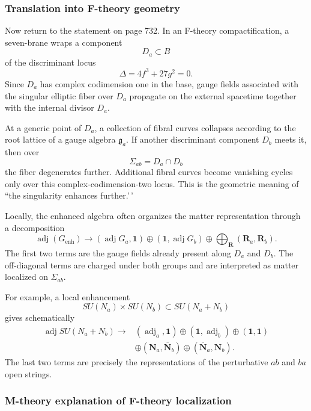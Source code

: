 \documentclass[
  10pt,
  a4paper,
  openany]{book}
\begin{document}
\subsubsection{Translation into F-theory
geometry}\label{translation-into-f-theory-geometry}

Now return to the statement on page 732. In an F-theory
compactification, a seven-brane wraps a component \[
D_a\subset B
\] of the discriminant locus \[
\Delta=4f^3+27g^2=0.
\] Since \(D_a\) has complex codimension one in the base, gauge fields
associated with the singular elliptic fiber over \(D_a\) propagate on
the external spacetime together with the internal divisor \(D_a\).

At a generic point of \(D_a\), a collection of fibral curves collapses
according to the root lattice of a gauge algebra \(\mathfrak g_a\). If
another discriminant component \(D_b\) meets it, then over \[
\Sigma_{ab}=D_a\cap D_b
\] the fiber degenerates further. Additional fibral curves become
vanishing cycles only over this complex-codimension-two locus. This is
the geometric meaning of ``the singularity enhances further.'\,'

Locally, the enhanced algebra often organizes the matter representation
through a decomposition \[
\operatorname{adj}(G_{\mathrm{enh}})
\longrightarrow
(\operatorname{adj}G_a,\mathbf1)
\oplus
(\mathbf1,\operatorname{adj}G_b)
\oplus
\bigoplus_{\mathbf R}
\left(\mathbf R_a,\mathbf R_b\right).
\] The first two terms are the gauge fields already present along
\(D_a\) and \(D_b\). The off-diagonal terms are charged under both
groups and are interpreted as matter localized on \(\Sigma_{ab}\).

For example, a local enhancement \[
SU(N_a)\times SU(N_b)
\subset SU(N_a+N_b)
\] gives schematically \[
\begin{aligned}
\operatorname{adj}SU(N_a+N_b)
\longrightarrow{}&
(\operatorname{adj}_{a},\mathbf1)
\oplus
(\mathbf1,\operatorname{adj}_{b})
\oplus
(\mathbf1,\mathbf1)\\
&\oplus
(\mathbf N_a,\overline{\mathbf N}_b)
\oplus
(\overline{\mathbf N}_a,\mathbf N_b).
\end{aligned}
\] The last two terms are precisely the representations of the
perturbative \(ab\) and \(ba\) open strings.

\subsubsection{M-theory explanation of F-theory
localization}\label{m-theory-explanation-of-f-theory-localization}
\end{document}

